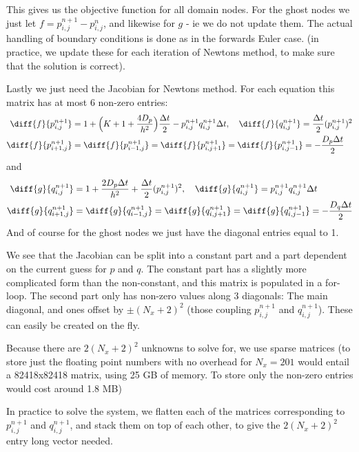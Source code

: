 \documentclass[a4paper,10pt]{article}
\begin{document}
	This gives us the objective function for all domain nodes. For the ghost nodes we just let $ f=p_{i,j}^{n+1} - p_{i,j}^{n}$, and likewise for $ g $ - ie we do not update them. The actual handling of boundary conditions is done as in the forwards Euler case. (in practice, we update these for each iteration of Newtons method, to make sure that the solution is correct).
	
	Lastly we just need the Jacobian for Newtons method. For each equation this matrix has at most 6 non-zero entries:
	\begin{align*}
		\diff{f}{p_{i,j}^{n+1}} &= 1+\Big(K+1+\frac{4D_p}{h^2}\Big) \frac{\Delta t}{2} - p_{i,j}^{n+1} q_{i,j}^{n+1}\Delta t, \quad \diff{f}{q_{i,j}^{n+1}} = \frac{\Delta t}{2} (p_{i,j}^{n+1})^2 \\
		\diff{f}{p_{i+1,j}^{n+1}} &= \diff{f}{p_{i-1,j}^{n+1}} = \diff{f}{p_{i,j+1}^{n+1}} = \diff{f}{p_{i,j-1}^{n+1}} = -\frac{D_p \Delta t}{2}
	\end{align*}
	and
	\begin{align*}
	\diff{g}{q_{i,j}^{n+1}} &= 1+\frac{2D_p \Delta t}{h^2} + \frac{\Delta t}{2} (p_{i,j}^{n+1})^2, \quad \diff{g}{q_{i,j}^{n+1}} = p_{i,j}^{n+1} q_{i,j}^{n+1} \Delta t \\
	\diff{g}{q_{i+1,j}^{n+1}} &= \diff{g}{q_{i-1,j}^{n+1}} = \diff{g}{q_{i,j+1}^{n+1}} = \diff{g}{q_{i,j-1}^{n+1}} = -\frac{D_q \Delta t}{2}
	\end{align*}
	And of course for the ghost nodes we just have the diagonal entries equal to 1.
	
	We see that the Jacobian can be split into a constant part and a part dependent on the current guess for $ p $ and $ q $. The constant part has a slightly more complicated form than the non-constant, and this matrix is populated in a for-loop. The second part only has non-zero values along 3 diagonals: The main diagonal, and ones offset by $ \pm (N_x+2)^2$ (those coupling $ p_{i,j}^{n+1} $ and $ q_{i,j}^{n+1} $). These can easily be created on the fly.
	
	Because there are $ 2 (N_x+2)^2$ unknowns to solve for, we use sparse matrices (to store just the floating point numbers with no overhead for $ N_x=201 $ would entail a 82418x82418 matrix, using 25 GB of memory. To store only the non-zero entries would cost around 1.8 MB)
	
	In practice to solve the system, we flatten each of the matrices corresponding to $ p_{i,j}^{n+1} $ and $ q_{i,j}^{n+1} $, and stack them on top of each other, to give the $ 2 (N_x+2)^2$ entry long vector needed. 
	
\end{document}
